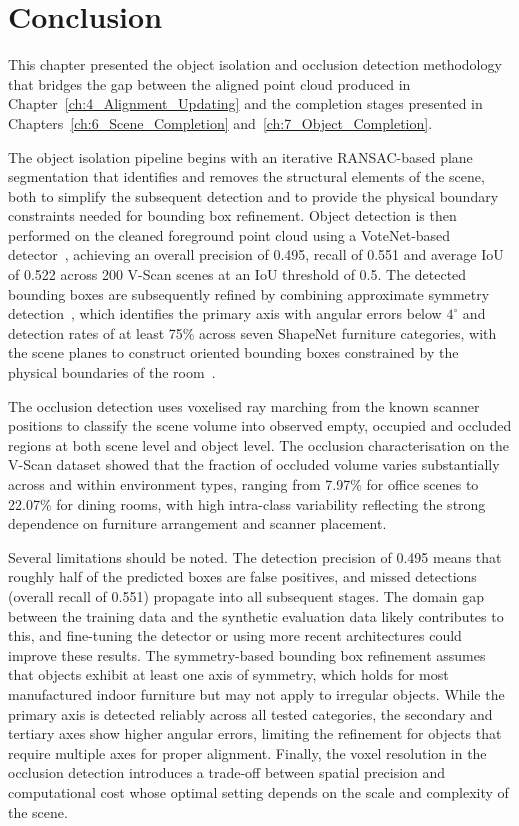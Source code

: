 \section{Conclusion}
\label{sec:5_conclusion}

This chapter presented the object isolation and occlusion detection methodology that bridges the gap between the aligned point cloud produced in Chapter~\ref{ch:4_Alignment_Updating} and the completion stages presented in Chapters~\ref{ch:6_Scene_Completion} and~\ref{ch:7_Object_Completion}.

The object isolation pipeline begins with an iterative RANSAC-based plane segmentation that identifies and removes the structural elements of the scene, both to simplify the subsequent detection and to provide the physical boundary constraints needed for bounding box refinement. Object detection is then performed on the cleaned foreground point cloud using a VoteNet-based detector~\cite{qi_deep_2019}, achieving an overall precision of 0.495, recall of 0.551 and average IoU of 0.522 across 200 V-Scan scenes at an IoU threshold of 0.5. The detected bounding boxes are subsequently refined by combining approximate symmetry detection~\cite{sipiran_approximate_2014}, which identifies the primary axis with angular errors below $4^{\circ}$ and detection rates of at least 75\% across seven ShapeNet furniture categories, with the scene planes to construct oriented bounding boxes constrained by the physical boundaries of the room~\cite{vermandere_guided_2025, korman_latent_2018}.

The occlusion detection uses voxelised ray marching from the known scanner positions to classify the scene volume into observed empty, occupied and occluded regions at both scene level and object level. The occlusion characterisation on the V-Scan dataset showed that the fraction of occluded volume varies substantially across and within environment types, ranging from 7.97\% for office scenes to 22.07\% for dining rooms, with high intra-class variability reflecting the strong dependence on furniture arrangement and scanner placement.

Several limitations should be noted. The detection precision of 0.495 means that roughly half of the predicted boxes are false positives, and missed detections (overall recall of 0.551) propagate into all subsequent stages. The domain gap between the training data and the synthetic evaluation data likely contributes to this, and fine-tuning the detector or using more recent architectures could improve these results. The symmetry-based bounding box refinement assumes that objects exhibit at least one axis of symmetry, which holds for most manufactured indoor furniture but may not apply to irregular objects. While the primary axis is detected reliably across all tested categories, the secondary and tertiary axes show higher angular errors, limiting the refinement for objects that require multiple axes for proper alignment. Finally, the voxel resolution in the occlusion detection introduces a trade-off between spatial precision and computational cost whose optimal setting depends on the scale and complexity of the scene.

